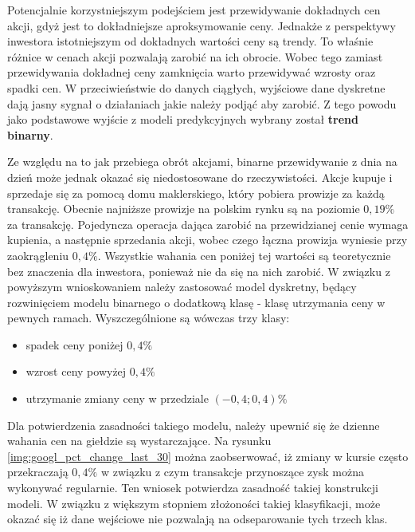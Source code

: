 \documentclass[a4paper, twoside, 11pt, openright]{article}
\begin{document}
Potencjalnie korzystniejszym podejściem jest przewidywanie dokładnych cen akcji, gdyż jest to dokładniejsze aproksymowanie ceny. Jednakże z perspektywy inwestora istotniejszym od dokładnych wartości ceny są trendy. To właśnie różnice w cenach akcji pozwalają zarobić na ich obrocie. Wobec tego zamiast przewidywania dokładnej ceny zamknięcia warto przewidywać wzrosty oraz spadki cen. W przeciwieństwie do danych ciągłych, wyjściowe dane dyskretne  dają jasny sygnał o działaniach jakie należy podjąć aby zarobić. Z tego powodu jako podstawowe wyjście z modeli predykcyjnych wybrany został \textbf{trend binarny}.

\bigskip

Ze względu na to jak przebiega obrót akcjami, binarne przewidywanie z dnia na dzień może jednak okazać się niedostosowane do rzeczywistości. Akcje kupuje i sprzedaje się za pomocą domu maklerskiego, który pobiera prowizje za każdą transakcję. Obecnie najniższe prowizje na polskim rynku są na poziomie $0,19\%$ za transakcję. Pojedyncza operacja dająca zarobić na przewidzianej cenie wymaga kupienia, a następnie sprzedania akcji, wobec czego łączna prowizja wyniesie przy zaokrągleniu $0,4\%$. Wszystkie wahania cen poniżej tej wartości są teoretycznie bez znaczenia dla inwestora, ponieważ nie da się na nich zarobić. W związku z powyższym wnioskowaniem należy zastosować model dyskretny, będący rozwinięciem modelu binarnego o dodatkową klasę - klasę utrzymania ceny w pewnych ramach. Wyszczególnione są wówczas trzy klasy:
\begin{itemize}
\item spadek ceny poniżej $0,4\%$
\item wzrost ceny powyżej $0,4\%$
\item utrzymanie zmiany ceny w przedziale $(-0,4; 0,4)\%$
\end{itemize}

Dla potwierdzenia zasadności takiego modelu, należy upewnić się że dzienne wahania cen na giełdzie są wystarczające. Na rysunku \ref{img:googl_pct_change_last_30} można zaobserwować, iż zmiany w kursie często przekraczają $0,4\%$ w związku z czym transakcje przynoszące zysk można wykonywać regularnie. Ten wniosek potwierdza zasadność takiej konstrukcji modeli. W związku z większym stopniem złożoności takiej klasyfikacji, może okazać się iż dane wejściowe nie pozwalają na odseparowanie tych trzech klas. 
\end{document}
